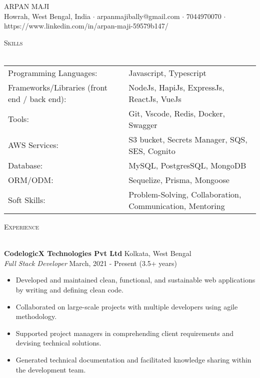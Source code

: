 \documentclass[a4paper]{article}
\newcommand{\lineunder} {
    \vspace*{-8pt} \\
    \hspace*{-18pt} \hrulefill \\
}
\newcommand{\header} [1] {
    {\hspace*{-18pt}\vspace*{6pt} \textsc{#1}}
    \vspace*{-6pt} \lineunder
}
\begin{document}
\vspace*{-40pt}

    

\vspace*{-10pt}
\begin{center}
	{\Huge \scshape {ARPAN MAJI}}\\
	Howrah, West Bengal, India $\cdot$ arpanmajibally@gmail.com $\cdot$ 7044970070 $\cdot$ https://www.linkedin.com/in/arpan-maji-59579b147/\\
\end{center}

\header{Skills}
\begin{tabular}{ l l }
	Programming Languages:                       & Javascript, Typescript                                   \\
	Frameworks/Libraries (front end / back end): & NodeJs, HapiJs, ExpressJs, ReactJs, VueJs                \\
	Tools:                                       & Git, Vscode, Redis, Docker, Swagger                      \\
	AWS Services:                                & S3 bucket, Secrets Manager, SQS, SES, Cognito            \\
	Database:                                    & MySQL, PostgresSQL, MongoDB                              \\
	ORM/ODM:                                     & Sequelize, Prisma, Mongoose                              \\
	Soft Skills:                                 & Problem-Solving, Collaboration, Communication, Mentoring \\
\end{tabular}
\vspace{2mm}

\header{Experience}
\vspace{1mm}

\textbf{CodelogicX Technologies Pvt Ltd} \hfill Kolkata, West Bengal\\
\textit{Full Stack Developer} \hfill March, 2021 - Present (3.5+ years)\\
\vspace{-1mm}
\begin{itemize} \itemsep 1pt
	\item Developed and maintained clean, functional, and sustainable web applications by writing and defining clean code.
	\item Collaborated on large-scale projects with multiple developers using agile methodology.
	\item Supported project managers in comprehending client requirements and devising technical solutions.
	\item Generated technical documentation and facilitated knowledge sharing within the development team.
\end{itemize}
\end{document}
